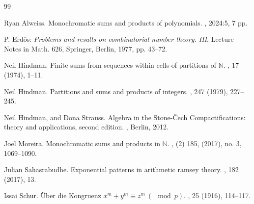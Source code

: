 \documentclass{aic}
\newcommand{\N}{\mathbb{N}}
\begin{document}

\begin{thebibliography}{99}


 Ryan Alweiss. \newblock Monochromatic sums and products of polynomials. 
, 2024:5, 7 pp.

 P. Erd\H{o}s: \textit{Problems and results on combinatorial number theory. III}, {Lecture Notes in Math.} {626}, Springer, Berlin, 1977, pp. 43–72. %


 Neil Hindman. 
\newblock Finite sums from sequences within cells of partitions of $\mathbb{N}$.
, 17 (1974), 1–11.

 Neil Hindman. 
\newblock Partitions and sums and products of integers.
, 247 (1979), 227–245.

 Neil Hindman, and Dona Strauss.
\newblock Algebra in the Stone-\v{C}ech Compactifications: theory and applications, second edition.
, Berlin, 2012.

 Joel Moreira.
\newblock Monochromatic sums and products in $\N$.
, (2) 185,  (2017), no. 3, 1069–1090.

 Julian Sahasrabudhe.
\newblock Exponential patterns in arithmetic ramsey theory.
, 182 (2017), 13.

 Issai Schur.
\newblock \"{U}ber die Kongruenz $x^{m}+y^{m}\equiv z^{m}~(\!\!\!\!\mod p)$.
, 25 (1916), 114–117.

\end{thebibliography}
\end{document}
